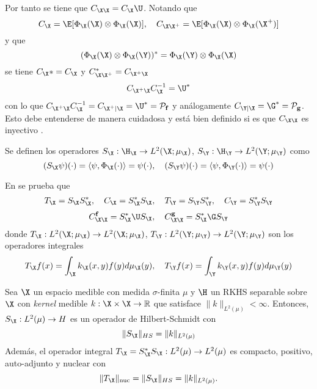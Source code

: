 Por tanto se tiene que $C_{\X \X} = C_{\X} \U  $. Notando que
\begin{equation*}
    	C_{\X} = \E[\Phi_\X (\X) \otimes \Phi_\X (\X)], \quad	C_{\X \X^+} = \E[\Phi_\X (\X) \otimes \Phi_\X (\X^+)]
\end{equation*}
y que 
\begin{equation*}
	(\Phi_\X (\X) \otimes \Phi_\X (\Y))^* = \Phi_\X (\Y) \otimes \Phi_\X (\X)
\end{equation*}
se tiene $C_{\X}* = C_{\X}$ y $C_{\X \X^+}^* = C_{\X^+ \X}$
\begin{equation*}
	C_{\X^+ \X} C_\X^{-1} =  \U^* 
\end{equation*}
con lo que $C_{\X^+ \X} C_\X^{-1} = C_{\X^+ | \X} = \U^* = \mathcal{P}_\mathbf{f}$ y análogamente $C_{\Y | \X} = \G^* = \mathcal{P}_\mathbf{g}$. Esto debe entenderse de manera cuidadosa y está bien definido si es que $C_{\X \X}$ es inyectivo \cite{Fukumizu2013}.
\begin{defn}
    Se definen los operadores $S_\X : \H_\X \to L^2(\X; \mu_\X)$, $S_\Y : \H_\Y \to L^2(\Y; \mu_\Y)$ como
    \begin{equation*}
        (S_\X \psi) (\cdot) = \langle \psi, \Phi_\X (\cdot) \rangle = \psi (\cdot), \quad (S_\Y \psi) (\cdot) = \langle \psi, \Phi_\Y (\cdot) \rangle = \psi (\cdot)
    \end{equation*}
\end{defn}
\noindent En \cite{Philipp2024} se prueba que
\begin{equation*}
    T_\X = S_\X S_\X^*, \quad  C_\X = S_\X^*S_\X, \quad  T_\Y = S_\Y S_\Y^*, \quad  C_\Y = S_\Y^*S_\Y
\end{equation*}
\begin{equation*}
	C_{\X \X}^{\mathbf{f}} = S_\X^* \U S_\X, \quad C_{\X \X}^{\mathbf{g}} = S_\X^* \G S_\Y
\end{equation*}
donde $T_\X : L^2(\X; \mu_\X) \to L^2(\X; \mu_\X)$, $T_\Y:L^2(\Y; \mu_\Y) \to L^2(\Y; \mu_\Y)$ son los operadores integrales
\begin{equation*}
    T_\X f (x) = \int_\X k_\X(x,y) f(y) d\mu_\X(y), \quad T_\Y f (x) = \int_\Y k_\Y (x,y) f(y) d\mu_\Y (y)
\end{equation*}

\begin{lema}
	Sea \( \X \) un espacio medible con medida \(\sigma\)-finita \(\mu\) y \( \H \) un RKHS separable sobre \( \X \) con \textit{kernel} medible \( k : \X \times \X \to \mathbb{R} \) que satisface \( \|k\|_{L^2(\mu)} < \infty \). Entonces, \( S_\X : L^2(\mu) \to H \) es un operador de Hilbert-Schmidt con
	\[
	\|S_\X\|_{HS} = \|k\|_{L^2(\mu)}
	\]
	Además, el operador integral \( T_\X = S_\X^* S_\X : L^2 (\mu) \to L^2 (\mu) \) es compacto, positivo, auto-adjunto y nuclear con
	\[
	\|T_\X\|_{\text{nuc}} = \|S_\X\|_{HS} = \|k\|_{L^2(\mu)}.
	\]
\end{lema}

